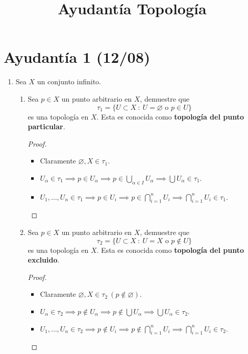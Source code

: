 \documentclass[a4paper]{report}
\title{Ayudantía Topología}
\author{}
\date{}
\begin{document}
\maketitle
\tableofcontents

\chapter{Ayudantía 1 (12/08)}

\begin{enumerate}
	\item Sea $X$ un conjunto infinito.
	\begin{enumerate}
		\item Sea $p \in X$ un punto arbitrario en $X$, demuestre que
		\[
		\tau_1 = \{ U \subset X \ : \ U = \varnothing \text{ o } p \in U \}
		\]
		es una topología en $X$. Esta es conocida como \textbf{topología del punto particular}.
		\begin{proof}~
			\begin{itemize}
				\item Claramente $\varnothing, X \in \tau_1$.

				\item $U_{\alpha} \in \tau_1 \implies p \in U_{\alpha} \implies p \in \bigcup_{\alpha \in I} U_{\alpha} \implies \bigcup U_{\alpha} \in \tau_1$.

				\item $U_1,\dots,U_n \in \tau_1 \implies p \in U_i \implies p \in \displaystyle\bigcap_{i=1}^{n} U_i \implies \displaystyle\bigcap_{i=1}^{n} U_i \in \tau_1$.
			\end{itemize}
		\end{proof}

		\item Sea $p \in X$ un punto arbitrario en $X$, demuestre que
		\[
		\tau_2 = \{ U \subset X \ : \ U = X \text{ o } p \not\in U \}
		\]
		es una topología en $X$. Esta es conocida como \textbf{topología del punto excluido}.
		\begin{proof}~
			\begin{itemize}
				\item Claramente $\varnothing, X \in \tau_2 \ (p \not\in \varnothing)$.

				\item $U_{\alpha} \in \tau_2 \implies p \not\in U_{\alpha} \implies p \not\in \bigcup U_{\alpha} \implies \bigcup U_{\alpha} \in \tau_2$.

				\item $U_1,\dots,U_n \in \tau_2 \implies p \not\in U_i \implies p \not\in \displaystyle\bigcap_{i=1}^{n} U_i \implies \displaystyle\bigcap_{i=1}^{n} U_i \in \tau_2$.
			\end{itemize}
		\end{proof}


\end{enumerate}
\end{enumerate}
\end{document}
